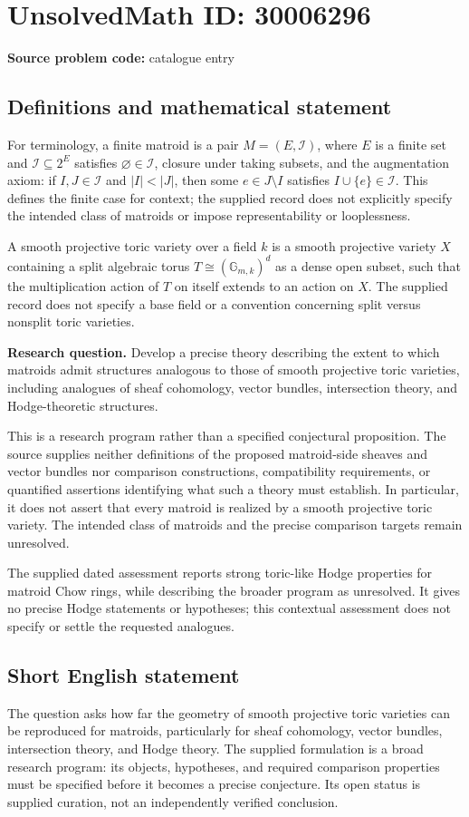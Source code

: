 \documentclass[11pt]{article}
\begin{document}
\section*{UnsolvedMath ID: 30006296}
\textbf{Source problem code:} catalogue entry
\subsection{Definitions and mathematical statement}
For terminology, a finite matroid is a pair \(M=(E,\mathcal I)\), where \(E\) is a finite set and \(\mathcal I\subseteq 2^E\) satisfies \(\varnothing\in\mathcal I\), closure under taking subsets, and the augmentation axiom: if \(I,J\in\mathcal I\) and \(|I|<|J|\), then some \(e\in J\setminus I\) satisfies \(I\cup\{e\}\in\mathcal I\). This defines the finite case for context; the supplied record does not explicitly specify the intended class of matroids or impose representability or looplessness.

A smooth projective toric variety over a field \(k\) is a smooth projective variety \(X\) containing a split algebraic torus \(T\cong(\mathbb G_{m,k})^d\) as a dense open subset, such that the multiplication action of \(T\) on itself extends to an action on \(X\). The supplied record does not specify a base field or a convention concerning split versus nonsplit toric varieties.

\textbf{Research question.} Develop a precise theory describing the extent to which matroids admit structures analogous to those of smooth projective toric varieties, including analogues of sheaf cohomology, vector bundles, intersection theory, and Hodge-theoretic structures.

This is a research program rather than a specified conjectural proposition. The source supplies neither definitions of the proposed matroid-side sheaves and vector bundles nor comparison constructions, compatibility requirements, or quantified assertions identifying what such a theory must establish. In particular, it does not assert that every matroid is realized by a smooth projective toric variety. The intended class of matroids and the precise comparison targets remain unresolved.

The supplied dated assessment reports strong toric-like Hodge properties for matroid Chow rings, while describing the broader program as unresolved. It gives no precise Hodge statements or hypotheses; this contextual assessment does not specify or settle the requested analogues.
\subsection{Short English statement}
The question asks how far the geometry of smooth projective toric varieties can be reproduced for matroids, particularly for sheaf cohomology, vector bundles, intersection theory, and Hodge theory. The supplied formulation is a broad research program: its objects, hypotheses, and required comparison properties must be specified before it becomes a precise conjecture. Its open status is supplied curation, not an independently verified conclusion.
\end{document}
